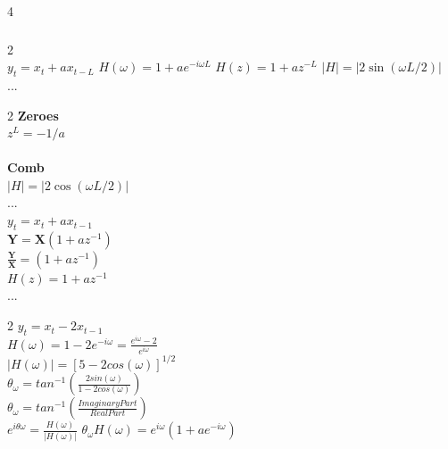 \documentclass[8pt,landscape,a4paper]{article}
\begin{document}
\begin{multicols}{4}
\scriptsize

\subsubsection*{}

\begin{multicols}{2}
\\
$y_t = x_t + ax_{t-L}$
$H(\omega) = 1 + ae^{-i\omega L}$
$H(z) = 1 + az^{-L}$
$|H| = |2\sin(\omega L/2)|$ \\
... \\
\end{multicols}
\begin{multicols}{2}
\textbf{Zeroes}\\ $z^L = -1/a$ \\ \\
\textbf{Comb} \\ $|H| = |2\cos(\omega L/2)|$ \\
... \\
$y_t = x_t + ax_{t-1} $ \\
$\textbf{Y} = \textbf{X}(1 + az^{-1}) $ \\
$\frac{\textbf{Y}}{\textbf{X}} = (1 + az^{-1}) $ \\
$H(z) = 1 + az^{-1}$ \\
... \\ 
\end{multicols}

\begin{multicols}{2}
$y_t = x_t - 2x_{t-1} $ \\
$H(\omega) = 1 - 2e^{-i\omega} = \frac{e^{i\omega} - 2}{e^{i\omega}}$ \\
$|H(\omega)| = [5 - 2cos(\omega)]^{1/2}$ \\
$\theta_\omega = tan^{-1}(\frac{2sin(\omega)}{1-2cos(\omega)})$\\
$\theta_\omega = tan^{-1}(\frac{Imaginary Part}{RealPart})$\\
$e^{i\theta\omega} = \frac{H(\omega)}{|H(\omega)|}$
$\theta_\omega H(\omega) = e^{i\omega}(1 + ae^{-i\omega})$ \\
\end{multicols}





\end{multicols}
\end{document}
